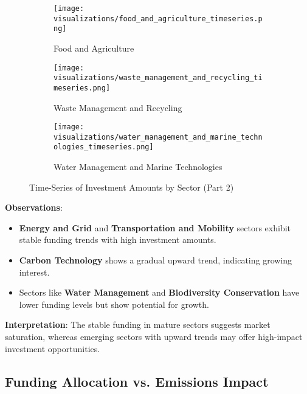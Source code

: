 \documentclass[sigconf]{acmart}
\begin{document}
\begin{figure*}[htpb]
    \centering
    \begin{subfigure}[t]{0.32\textwidth}
        \texttt{[image: visualizations/food\_and\_agriculture\_timeseries.png]}
        \caption{Food and Agriculture}
    \end{subfigure}
    \hfill
    \begin{subfigure}[t]{0.32\textwidth}
        \texttt{[image: visualizations/waste\_management\_and\_recycling\_timeseries.png]}
        \caption{Waste Management and Recycling}
    \end{subfigure}
    \hfill
    \begin{subfigure}[t]{0.32\textwidth}
        \texttt{[image: visualizations/water\_management\_and\_marine\_technologies\_timeseries.png]}
        \caption{Water Management and Marine Technologies}
    \end{subfigure}
    \caption{Time-Series of Investment Amounts by Sector (Part 2)}
    \label{fig:sector_timeseries2}
\end{figure*}

\textbf{Observations}:

\begin{itemize}
    \item \textbf{Energy and Grid} and \textbf{Transportation and Mobility} sectors exhibit stable funding trends with high investment amounts.
    \item \textbf{Carbon Technology} shows a gradual upward trend, indicating growing interest.
    \item Sectors like \textbf{Water Management} and \textbf{Biodiversity Conservation} have lower funding levels but show potential for growth.
\end{itemize}

\textbf{Interpretation}: The stable funding in mature sectors suggests market saturation, whereas emerging sectors with upward trends may offer high-impact investment opportunities.

\subsection{Funding Allocation vs. Emissions Impact}
\end{document}
